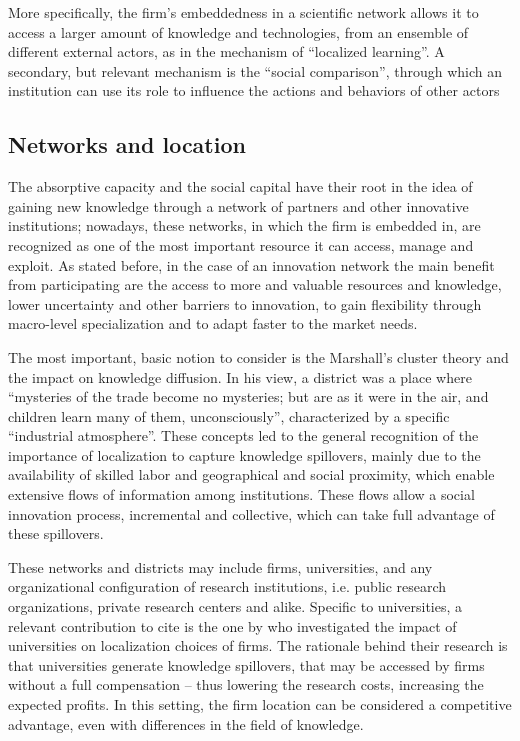 More specifically, the firm's embeddedness in a scientific network allows it to access a larger amount of knowledge and technologies, from an ensemble of different external actors, as in the mechanism of \enquote{localized learning}. A secondary, but relevant mechanism is the \enquote{social comparison}, through which an institution can use its role to influence the actions and behaviors of other actors \citep{Slavova2015}

\subsection{Networks and location}
The absorptive capacity and the social capital have their root in the idea of gaining new knowledge through a network of partners and other innovative institutions; nowadays, these networks, in which the firm is embedded in, are recognized as one of the most important resource it can access, manage and exploit. As stated before, in the case of an innovation network the main benefit from participating are the access to more and valuable resources and knowledge, lower uncertainty and other barriers to innovation, to gain flexibility through macro-level specialization and to adapt faster to the market needs. 

The most important, basic notion to consider is the Marshall's cluster theory \citep{Marshall1890} and the impact on knowledge diffusion. In his view, a district was a place where \enquote{mysteries of the trade become no mysteries; but are as it were in the air, and children learn many of them, unconsciously}, characterized by a specific \enquote{industrial atmosphere}. These concepts led to the general recognition of the importance of localization to capture knowledge spillovers, mainly due to the availability of skilled labor and geographical and social proximity, which enable extensive flows of information among institutions. These flows allow a social innovation process, incremental and collective, which can take full advantage of these spillovers.

These networks and districts may include firms, universities, and any organizational configuration of research institutions, i.e. public research organizations, private research centers and alike. Specific to universities, a relevant contribution to cite is the one by \citet{Audretsch2004} who investigated the impact of universities on localization choices of firms. The rationale behind their research is that universities generate knowledge spillovers, that may be accessed by firms without a full compensation – thus lowering the research costs, increasing the expected profits. In this setting, the firm location can be considered a competitive advantage, even with differences in the field of knowledge. 

